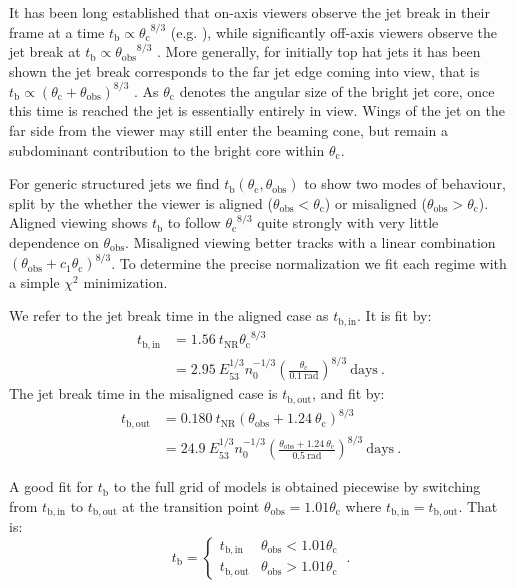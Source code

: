 \documentclass[twocolumn]{aastex62}
\newcommand{\tNR}{\ensuremath{t_{\mathrm{NR}}}}
\newcommand{\tb}{\ensuremath{t_{\mathrm{b}}}}
\newcommand{\tbin}{\ensuremath{t_{\mathrm{b, in}}}}
\newcommand{\tbout}{\ensuremath{t_{\mathrm{b, out}}}}
\newcommand{\thobs}{\ensuremath{\theta_{\mathrm{obs}}}}
\newcommand{\thC}{\ensuremath{\theta_{\mathrm{c}}}}
\begin{document}
It has been long established that on-axis viewers observe the jet break in their frame at a time $\tb \propto \thC^{8/3}$ (e.g. \citet{Rhoads:1999aa}), while significantly off-axis viewers observe the jet break at $\tb \propto \thobs^{8/3}$ \citep{Rossi:2002aa, Panaitescu:2003aa}.  More generally, for initially top hat jets it has been shown the jet break corresponds to the far jet edge coming into view, that is $\tb \propto (\thC + \thobs)^{8/3}$ \citep{van-Eerten:2010aa}.  As $\thC$ denotes the angular size of the bright jet core, once this time is reached the jet is essentially entirely in view.  Wings of the jet on the far side from the viewer may still enter the beaming cone, but remain a subdominant contribution to the bright core within $\thC$.  

For generic structured jets we find $\tb(\thC, \thobs)$ to show two modes of behaviour, split by the whether the viewer is aligned ($\thobs < \thC$) or misaligned ($\thobs > \thC$).  Aligned viewing shows $\tb$ to follow $\thC^{8/3}$ quite strongly with very little dependence on $\thobs$.  Misaligned viewing better tracks with a linear combination $(\thobs + c_1 \thC)^{8/3}$.  To determine the precise normalization we fit each regime with a simple $\chi^2$ minimization.

We refer to the jet break time in the aligned case as $\tbin$.  It is fit by:
\begin{align}
	\tbin &= 1.56\ \tNR \thC^{8/3} \label{eq:tbin}\\
		&= 2.95\ E_{53}^{1/3} n_0^{-1/3} \left(\frac{\thC}{0.1\ \mathrm{rad}}\right)^{8/3}\ \mathrm{days}\ . \nonumber 
\end{align}
The jet break time in the misaligned case is $\tbout$, and fit by:
\begin{align}
	\tbout &= 0.180\ \tNR (\thobs+1.24\ \!\thC)^{8/3} \label{eq:tbout} \\
		&= 24.9\ E_{53}^{1/3} n_0^{-1/3} \left(\frac{\thobs+1.24\ \!\thC}{0.5\ \mathrm{rad}}\right)^{8/3}\ \mathrm{days}\ . \nonumber 			
\end{align}

A good fit for $\tb$ to the full grid of models is obtained piecewise by switching from $\tbin$ to $\tbout$ at the transition point $\thobs = 1.01 \thC$ where $\tbin = \tbout$.  That is:
\begin{equation}
	\tb = \begin{cases}
			\tbin & \thobs < 1.01 \thC \\
			\tbout & \thobs > 1.01 \thC
		\end{cases} \ . \label{eq:tb}
\end{equation}
\end{document}
